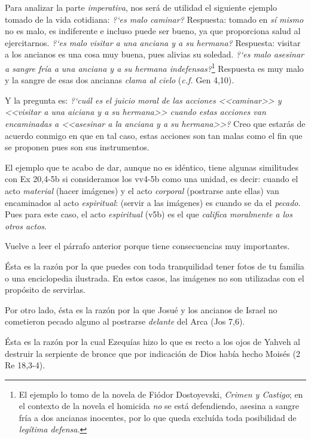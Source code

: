 \documentclass{article}
\begin{document}
Para analizar la parte \emph{imperativa}, nos ser\'a de utilidad el siguiente ejemplo tomado de la vida cotidiana: \emph{?`es malo caminar?} Respuesta: tomado en \emph{s\'i mismo} no es malo, es indiferente e incluso puede ser bueno, ya que proporciona salud al ejercitarnos. \emph{?`es malo visitar a una anciana y a su hermana?} Respuesta: visitar a los ancianos es una cosa muy buena, pues alivias su soledad. \emph{?`es malo asesinar a sangre fr\'{i}a a una anciana y a su hermana indefensas?}\footnote{El ejemplo lo tomo de la novela de Fiódor Dostoyevski, \emph{Crimen y Castigo}; en el contexto de la novela el homicida \emph{no} se est\'a defendiendo, asesina a sangre fr\'{i}a a dos ancianas inocentes, por lo que queda exclu\'{i}da toda posibilidad de \emph{leg\'{i}tima defensa}.} Respuesta es muy malo y la sangre de esas dos ancianas \emph{clama al cielo} (\emph{c.f.} Gen 4,10).

Y la pregunta es: \emph{?`cu\'al es el juicio moral de las acciones <<caminar>> y <<visitar a una aiciana y a su hermana>> cuando estas acciones van encaminadas a <<asesinar a la anciana y a su hermana>>?} Creo que estar\'as de acuerdo conmigo en que en tal caso, estas acciones son tan malas como el fin que se proponen pues son sus instrumentos.

El ejemplo que te acabo de dar, aunque no es id\'entico, tiene algunas similitudes con Ex 20,4-5b si consideramos los vv4-5b como una unidad, es decir: cuando el acto \emph{material} (hacer im\'agenes) y el acto \emph{corporal} (postrarse ante ellas) van encaminados al acto \emph{espiritual}: (servir a las im\'agenes) es cuando se da el \emph{pecado}. Pues para este caso, el acto \emph{espiritual} (v5b) es el que \emph{califica moralmente a los otros actos}.

Vuelve a leer el p\'arrafo anterior porque tiene consecuencias muy importantes.

\'Esta es la raz\'on por la que puedes con toda tranquilidad tener fotos de tu familia o una enciclopedia ilustrada. En estos casos, las im\'agenes no son utilizadas con el prop\'osito de servirlas.

Por otro lado, \'esta es la raz\'on por la que Josu\'e y los ancianos de Israel no cometieron pecado alguno al postrarse \emph{delante} del Arca (Jos 7,6).

\'Esta es la raz\'on por la cual Ezequ\'{i}as hizo lo que es recto a los ojos de Yahveh al destruir la serpiente de bronce que por indicaci\'on de Dios hab\'{i}a hecho Mois\'es (2 Re 18,3-4).
\end{document}
